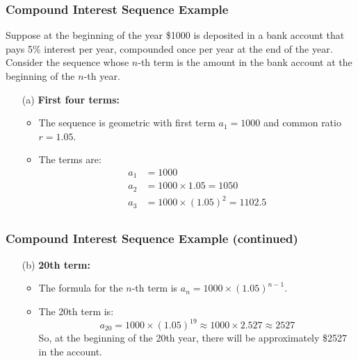 \begin{frame}
    \frametitle{Compound Interest Sequence Example}
    Suppose at the beginning of the year \$1000 is deposited in a bank account that pays 5\% interest per year, compounded once per year at the end of the year. Consider the sequence whose \(n\)-th term is the amount in the bank account at the beginning of the \(n\)-th year.
    \pause

    \begin{solutionblock}
    \begin{enumerate}
        \item[(a)] \textbf{First four terms:}
        \begin{itemize}
            \item The sequence is geometric with first term \(a_1 = 1000\) and common ratio \(r = 1.05\).
            \item The terms are:
            \begin{align*}
                a_1 &= 1000 \\
                a_2 &= 1000 \times 1.05 = 1050 \\
                a_3 &= 1000 \times (1.05)^2 = 1102.5 \\
            \end{align*}
        \end{itemize}
        \end{enumerate}
        \end{solutionblock}
    \end{frame}

\begin{frame}
    \frametitle{Compound Interest Sequence Example (continued)}
    \begin{solutionblock}
    \begin{enumerate}
        \item[(b)] \textbf{20th term:}
        \begin{itemize}
            \item The formula for the \(n\)-th term is \(a_n = 1000 \times (1.05)^{n-1}\).
            \item The 20th term is:
            \[
                a_{20} = 1000 \times (1.05)^{19} \approx 1000 \times 2.527 \approx 2527
            \]
            So, at the beginning of the 20th year, there will be approximately \$2527 in the account.
        \end{itemize}
    \end{enumerate}
\end{solutionblock}
\end{frame}

